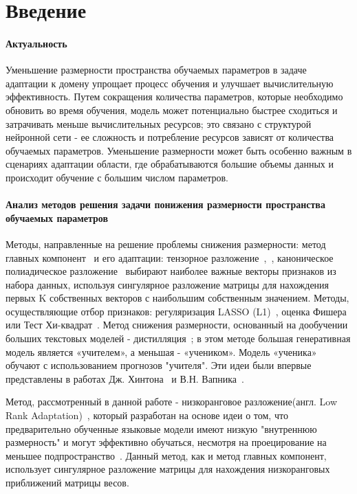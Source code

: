 \newpage


\section{Введение}
\paragraph{Актуальность} 
    Уменьшение размерности пространства обучаемых параметров в задаче адаптации к домену упрощает процесс обучения и улучшает вычислительную эффективность. Путем сокращения количества параметров, которые необходимо обновить во время обучения, модель может потенциально быстрее сходиться и затрачивать меньше вычислительных ресурсов; это связано с структурой нейронной сети - ее сложность и потребление ресурсов зависят от количества обучаемых параметров. Уменьшение размерности может быть особенно важным в сценариях адаптации области, где обрабатываются большие объемы данных и происходит обучение с большим числом параметров.
    
\paragraph{Анализ методов решения задачи понижения размерности пространства обучаемых параметров}
    Методы, направленные на решение проблемы снижения размерности: метод главных компонент~\cite{wold1987principal} и его адаптации: тензорное разложение~\cite{oseledets2011tensor},~\cite{qazi2024gpt}, каноническое полиадическое разложение~\cite{zare2018extension} выбирают наиболее важные векторы признаков из набора данных, используя сингулярное разложение матрицы для нахождения первых K собственных векторов с наибольшим собственным значением. Методы, осуществляющие отбор признаков: регуляризация LASSO (L1)~\cite{fonti2017feature}, оценка Фишера~\cite{gu2012generalized} или Тест Хи-квадрат~\cite{zhai2018chi}. Метод снижения размерности, основанный на дообучении больших текстовых моделей - дистилляция~\cite{hsieh2023distilling}; в этом методе большая генеративная модель является «учителем», а меньшая - «учеником». Модель «ученика» обучают с использованием прогнозов "учителя". Эти идеи были впервые представлены в работах Дж. Хинтона~\cite{hinton2015nips} и В.Н. Вапника~\cite{vapnik2015learning}.

    Метод, рассмотренный в данной работе - низкоранговое разложение(англ. Low Rank Adaptation)~\cite{hu2021lora}, который разработан на основе идеи о том, что предварительно обученные языковые модели имеют низкую "внутреннюю размерность" и могут эффективно обучаться, несмотря на проецирование на меньшее подпространство~\cite{aghajanyan2020intrinsic}. Данный метод, как и метод главных компонент, использует сингулярное разложение матрицы для нахождения низкоранговых приближений матрицы весов. 

